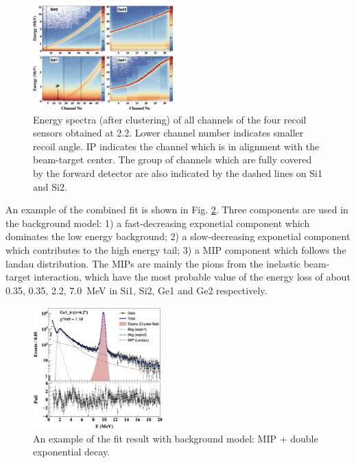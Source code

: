 \documentclass[number,5p]{elsarticle}
\begin{document}
\begin{figure}[htb!]
  \centering
  \includegraphics[width=0.48\textwidth]{./e_map.png}
  \caption{Energy spectra (after clustering) of all channels of the four recoil
    sensors obtained at \SI{2.2}{\momentum}.
    Lower channel number indicates smaller recoil angle.
    IP indicates the channel which is in alignment with
    the beam-target center.
    The group of channels which are fully covered by the forward detector are
    also indicated by the dashed lines on Si1 and Si2.
  }
  \label{fig:e_map}
\end{figure}

An example of the combined fit is shown in Fig. \ref{fig:e_fit}.
Three components are used in the background model: 1) a
fast-decreasing exponetial component which dominates the low energy background; 2)
a slow-decreasing exponetial component which contributes to the high energy
tail; 3) a MIP component which follows the landau distribution.
The MIPs are mainly the pions from the inelastic beam-target interaction, which
have the most probable value of the energy loss of about \num{0.35}, \num{0.35},
\num{2.2}, \SI{7.0}{MeV} in Si1, Si2, Ge1 and Ge2 respectively.
\begin{figure}[h!]
  \centering
  \includegraphics[width=0.45\textwidth]{./e_fit.png}
  \caption{An example of the fit result with background model: MIP + double
    exponential decay.}
  \label{fig:e_fit}
\end{figure}
\end{document}
